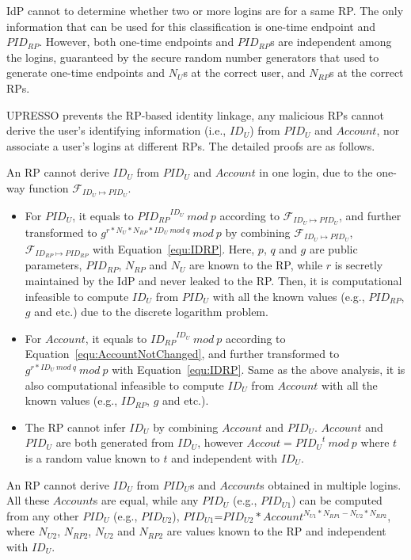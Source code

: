 IdP cannot to determine whether two or more logins are for a same RP. The only information that can be used for this classification is one-time endpoint and $PID_{RP}$. However, both one-time endpoints and $PID_{RP}$s are independent among the logins, guaranteed by the secure random number generators that used to generate one-time endpoints and $N_{U}$s at the correct user, and $N_{RP}$s at the correct RPs.

UPRESSO prevents the RP-based identity linkage, any malicious RPs cannot derive the user's identifying information (i.e., $ID_U$) from $PID_U$ and $Account$, nor associate a user's logins at different RPs.
The detailed proofs are as follows.

An RP cannot derive $ID_U$ from $PID_U$ and $Account$ in one login, due to the one-way function $\mathcal{F}_{ID_{U} \mapsto PID_{U}}$.
\begin{itemize}
  \item For $PID_U$, it equals to ${PID_{RP}}^{ID_U}\ mod\ p$ according to $\mathcal{F}_{ID_{U} \mapsto PID_{U}}$, and further transformed to $g^{r*N_U*N_{RP}*ID_U\ mod\ q}\ mod\ p$ by combining $\mathcal{F}_{ID_{U} \mapsto PID_{U}}$, $\mathcal{F}_{ID_{RP} \mapsto PID_{RP}}$ with Equation~\ref{equ:IDRP}.
      Here, $p$, $q$ and $g$ are public parameters, $PID_{RP}$, $N_{RP}$ and $N_U$ are known to the RP, while $r$ is secretly maintained by the IdP and never leaked to the RP.
      Then, it is computational infeasible to compute $ID_U$ from $PID_U$ with all the known values (e.g., $PID_{RP}$, $g$ and etc.) due to the discrete logarithm problem.
  \item For $Account$, it equals to ${ID_{RP}}^{ID_U}\ mod\ p$ according to Equation~\ref{equ:AccountNotChanged}, and further transformed to $g^{r*ID_U\ mod\ q}\ mod\ p$ with Equation~\ref{equ:IDRP}. Same as the above analysis, it is also computational infeasible to compute $ID_U$ from $Account$ with all the known values (e.g., $ID_{RP}$, $g$ and etc.).
  \item The RP cannot infer $ID_U$ by combining $Account$ and $PID_U$.
        $Account$ and $PID_U$ are both generated from $ID_U$, however $Accout={PID_U}^t\ mod\ p$ where $t$ is a random value known to $t$ and independent with $ID_U$.
\end{itemize}

An RP cannot derive $ID_U$ from $PID_U$s and $Account$s obtained in multiple logins. All these $Account$s are equal,  while any $PID_{U}$ (e.g., $PID_{U1}$) can be computed from any other $PID_{U}$ (e.g., $PID_{U2}$),  $PID_{U1}$=$PID_{U2} * Account^{N_{U1}*N_{RP1}-N_{U2}*N_{RP2}}$, where $N_{U2}$, $N_{RP2}$, $N_{U2}$ and $N_{RP2}$ are values known to the RP and independent with $ID_U$.

